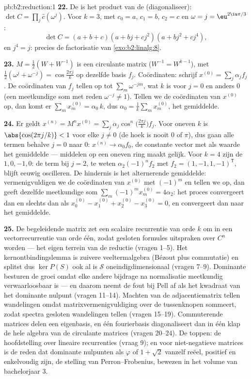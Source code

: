 \begin{solution}{pb:b2:reduction:1}
\textbf{22.} De  is het product van de 
(diagonaliseer): $\det C = \prod_{j}\widehat c(\omega^j)$. Voor $k
= 3$, met $c_0 = a$, $c_1 = b$, $c_2 = c$ en $\omega = j =
\eu^{2\iu\pi/3}$:
\[
\det C = (a + b + c)(a + bj + cj^2)(a + bj^2 + cj^4),
\]
en $j^4 = j$: precies de factorisatie van
\cref{exo:b2:linalg:8}.

\textbf{23.} $M = \frac12(W + W^{-1})$ is een circulante matrix
($W^{-1} = W^{k-1}$), met  $\frac12(\omega^j +
\omega^{-j}) = \cos\frac{2\pi j}k$ op dezelfde basis $f_j$.
Coördinaten: schrijf $x^{(0)} = \sum_j \alpha_j f_j$. De
coördinaten van $f_j$ tellen op tot $\sum_m \omega^{-jm}$, wat $k$
is voor $j = 0$ en anders $0$ (een meetkundige som met reden
$\omega^{-j} \neq 1$). Tellen we de coördinaten van $x^{(0)}$ op,
dan komt er $\sum_m x^{(0)}_m = \alpha_0\,k$, dus $\alpha_0 =
\frac1k\sum_m x^{(0)}_m$, het gemiddelde.

\textbf{24.} Er geldt $x^{(n)} = M^nx^{(0)} = \sum_j
\alpha_j\cos^n\bigl(\tfrac{2\pi j}k\bigr)f_j$. Voor oneven $k$ is
$\abs{\cos(2\pi j/k)} < 1$ voor elke $j \neq 0$ (de hoek is nooit
$0$ of $\pi$), dus gaan alle termen behalve $j = 0$ naar $0$:
$x^{(n)} \to \alpha_0 f_0$, de constante vector met als waarde het
gemiddelde --- middelen op een oneven ring maakt gelijk. Voor $k =
4$ zijn de  $1, 0, -1, 0$: de term bij $j = 2$, te
weten $\alpha_2(-1)^nf_2$ met $f_2 = (1, -1, 1, -1)^{\mathsf T}$,
blijft eeuwig oscilleren. De hindernis is het alternerende
gemiddelde: vermenigvuldigen we de coördinaten van $x^{(0)}$ met
$(-1)^m$ en tellen we op, dan geeft dezelfde meetkundige som
$\sum_m (-1)^mx^{(0)}_m = 4\alpha_2$: het proces convergeert dan en
slechts dan als $x^{(0)}_0 - x^{(0)}_1 + x^{(0)}_2 - x^{(0)}_3 =
0$, en convergeert dan naar het gemiddelde.

\textbf{25.} De begeleidende matrix zet een scalaire recurrentie
van orde $k$ om in een vectorrecurrentie van orde één, zodat
gesloten formules uitspraken over $C^n$ worden --- het eigen
terrein van de reductie (vragen 1--5). Het kernontbindingslemma is
zuivere veeltermalgebra (Bézout plus commutatie) en splitst dus
$\ker P(S)$ ook al is $\mathcal{S}$ oneindigdimensionaal (vragen
7--9). Dominante  besturen de groei omdat elke andere
bijdrage na normalisatie meetkundig verwaarloosbaar is --- en
daarom neemt de fout bij Pell af als het kwadraat van het dominante
nulpunt (vragen 11--14). Machten van de adjacentiematrix tellen
wandelingen omdat matrixvermenigvuldiging over de tussenknopen
sommeert, zodat spectra gesloten wandelingen tellen (vragen
15--19). Commuterende matrices delen een eigenbasis, en één
fourierbasis diagonaliseert dan in één klap de hele algebra van de
circulante matrices (vragen 20--24). De toppen: de hoofdstelling
over lineaire recurrenties (vraag 9); en voor niet-negatieve
matrices is de reden dat dominante nulpunten als $\varphi$ of $1 +
\sqrt2$ vanzelf reëel, positief en enkelvoudig zijn, de stelling
van Perron--Frobenius, bewezen in het volume van bachelorjaar 3.
\end{solution}
